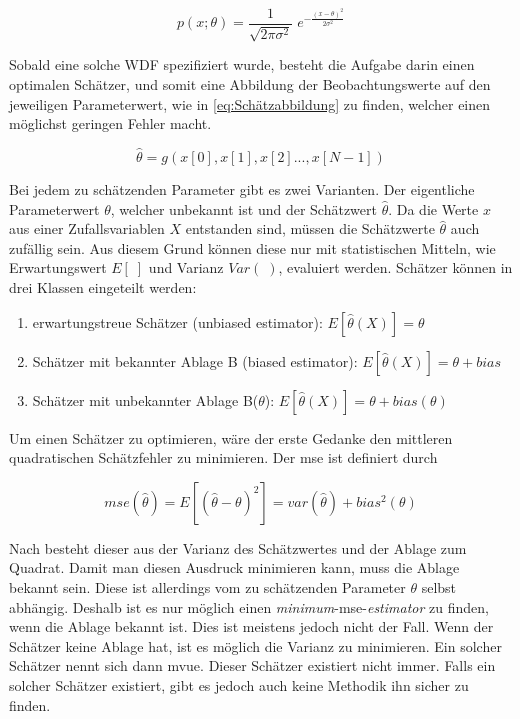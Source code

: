 \begin{equation}
	\label{eq:gaussverteilung}
	p(x;\theta) = \frac{1}{\sqrt{2\pi\sigma^2}} \; e^{-\frac{(x-\theta)^2}{2\sigma^2}}
\end{equation}

Sobald eine solche \gls{WDF} spezifiziert wurde, besteht die Aufgabe darin einen optimalen Schätzer, und somit eine  Abbildung der Beobachtungswerte auf den jeweiligen Parameterwert, wie in \eqref{eq:Schätzabbildung} zu finden, welcher einen möglichst geringen Fehler macht. 

\begin{equation}
	\label{eq:Schätzabbildung}
	\hat{\theta} = g(x[0],x[1],x[2]...,x[N-1])
\end{equation} 

Bei jedem zu schätzenden Parameter gibt es zwei Varianten. Der eigentliche Parameterwert $\theta$, welcher unbekannt ist und der Schätzwert $\hat{\theta}$.
Da die Werte $x$ aus einer Zufallsvariablen $X$ entstanden sind, müssen die Schätzwerte $\hat{\theta}$ auch zufällig sein. Aus diesem Grund können diese nur mit statistischen Mitteln, wie Erwartungswert $E[\;]$ und Varianz $Var(\;)$, evaluiert werden. 
Schätzer können in drei Klassen eingeteilt werden:

\begin{enumerate}
	\item erwartungstreue Schätzer (unbiased estimator): $E[\hat{\theta}(X)] = \theta$
	\item Schätzer mit bekannter Ablage B (biased estimator): $E[\hat{\theta}(X)] = \theta + bias$
	\item Schätzer mit unbekannter Ablage B($\theta$):  $E[\hat{\theta}(X)] = \theta + bias(\theta)$
\end{enumerate}

 Um einen Schätzer zu optimieren, wäre der erste Gedanke den mittleren quadratischen Schätzfehler zu minimieren. Der \gls{mse} ist definiert durch 
 
\begin{equation}
	\label{eq:MSE}
	mse(\hat{\theta}) = E \left[(\hat{\theta} - \theta)^2\right] = var(\hat{\theta}) + bias^2(\theta)
\end{equation}  

Nach \cite[S.19]{kay1993fundamentals} besteht dieser aus der Varianz des Schätzwertes und der Ablage zum Quadrat. Damit man diesen Ausdruck minimieren kann, muss die Ablage bekannt sein. Diese ist allerdings vom zu schätzenden Parameter $\theta$ selbst abhängig. Deshalb ist es nur möglich einen \emph{minimum}-\gls{mse}-\emph{estimator} zu finden, wenn die Ablage bekannt ist. Dies ist meistens jedoch nicht der Fall. Wenn der Schätzer keine Ablage hat, ist es möglich die Varianz zu minimieren. Ein solcher Schätzer nennt sich dann  \gls{mvue}. Dieser Schätzer existiert nicht immer. Falls ein solcher Schätzer existiert, gibt es jedoch auch keine Methodik ihn sicher zu finden\cite[S.20f.]{kay1993fundamentals}. 

